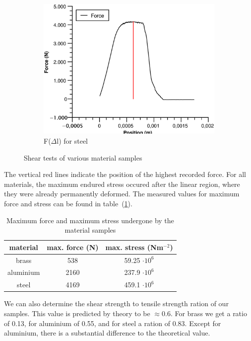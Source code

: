 \documentclass{scrartcl}
\begin{document}
\begin{figure}[!ht]
\begin{subfigure}{0.32\textwidth}
        \includegraphics[width=\textwidth]{Shear/ShearSteel.eps}
        \caption{F($\Delta$l) for steel}
        \label{fig:shearSteel}
    \end{subfigure}
    \caption{Shear tests of various material samples}
    \label{fig:shearTest}
\end{figure}
\FloatBarrier

The vertical red lines indicate the position of the highest recorded force. For all materials, the maximum endured stress occured after the linear region, where they were already permanently deformed. The measured values for maximum force and stress can be found in table~(\ref{tab:shearStrength}).

\begin{table}[!ht]
    \centering
    \begin{tabular}{c|c|c}
        material & max. force (N) & max. stress (Nm$^{-2}$)\\ \hline
        brass & 538 & 59.25 $\cdot 10^{6}$ \\
        aluminium & 2160 & 237.9 $\cdot 10^{6}$ \\
        steel & 4169 & 459.1 $\cdot 10^{6}$
    \end{tabular}
    \caption{Maximum force and maximum stress undergone by the material samples}
    \label{tab:shearStrength}
\end{table}

We can also determine the shear strength to tensile strength ration of our samples. This value is predicted by theory to be $\approx 0.6$. For brass we get a ratio of 0.13, for aluminium of 0.55, and for steel a ration of 0.83. Except for aluminium, there is a substantial difference to the theoretical value.
\end{document}
